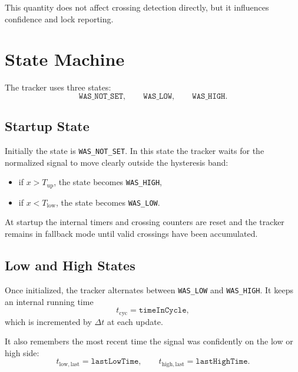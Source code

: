 \documentclass[conference]{IEEEtran}
\begin{document}
This quantity does not affect crossing detection directly, but it influences
confidence and lock reporting.

\section{State Machine}

The tracker uses three states:
\begin{equation}
  \texttt{WAS\_NOT\_SET},\qquad
  \texttt{WAS\_LOW},\qquad
  \texttt{WAS\_HIGH}.
\end{equation}

\subsection{Startup State}

Initially the state is \texttt{WAS\_NOT\_SET}. In this state the tracker waits
for the normalized signal to move clearly outside the hysteresis band:
\begin{itemize}[leftmargin=1.4em]
  \item if \(x > T_{\mathrm{up}}\), the state becomes \texttt{WAS\_HIGH},
  \item if \(x < T_{\mathrm{low}}\), the state becomes \texttt{WAS\_LOW}.
\end{itemize}

At startup the internal timers and crossing counters are reset and the tracker
remains in fallback mode until valid crossings have been accumulated.

\subsection{Low and High States}

Once initialized, the tracker alternates between \texttt{WAS\_LOW} and
\texttt{WAS\_HIGH}. It keeps an internal running time
\begin{equation}
  t_{\mathrm{cyc}} = \texttt{timeInCycle},
\end{equation}
which is incremented by \(\Delta t\) at each update.

It also remembers the most recent time the signal was confidently on the low
or high side:
\begin{equation}
  t_{\mathrm{low,last}} = \texttt{lastLowTime},
  \qquad
  t_{\mathrm{high,last}} = \texttt{lastHighTime}.
\end{equation}
\end{document}
